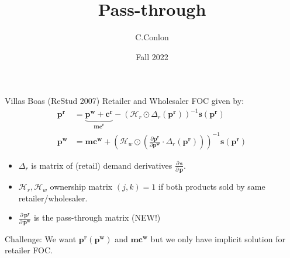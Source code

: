 

\title []{Pass-through}
\author{C.Conlon }
\date{Fall 2022}


\begin{frame}
\titlepage
\end{frame}






\begin{frame}{Villas Boas (ReStud 2007)}
Retailer and Wholesaler FOC given by:
\begin{align*}
\symbf{p^r} &= \underbrace{\symbf{p^w} +\symbf{c^r}}_{\symbf{mc^r}} -(\mathcal{H}_r \odot \Delta_{r}(\symbf{p^r}))^{-1} \symbf{s}(\symbf{p^r})\\
\symbf{p^w}  &= \symbf{mc^w} + \left(\mathcal{H}_{w} \odot \left( \frac{\partial \symbf{p^r}}{\partial \symbf{p^w}} \cdot  \Delta_r(\symbf{p^r} ) \right) \right)^{-1} \symbf{s}(\symbf{p^r})
\end{align*}
\begin{itemize}
  \item $\Delta_r$ is matrix of (retail) demand derivatives $\frac{\partial\, \symbf{s}}{\partial\, \symbf{p}}$.
\item $\mathcal{H}_r,\mathcal{H}_w$  ownership matrix $(j,k)=1$ if both products sold by same retailer/wholesaler.
\item $\frac{\partial\, \symbf{p^r}}{\partial\, \symbf{p^w}}$ is the \alert{pass-through matrix} (NEW!)
\end{itemize}
Challenge: We want $\symbf{p^r}(\symbf{p^w})$ and $\symbf{mc^w}$ but we only have implicit solution for retailer FOC.
\end{frame}

